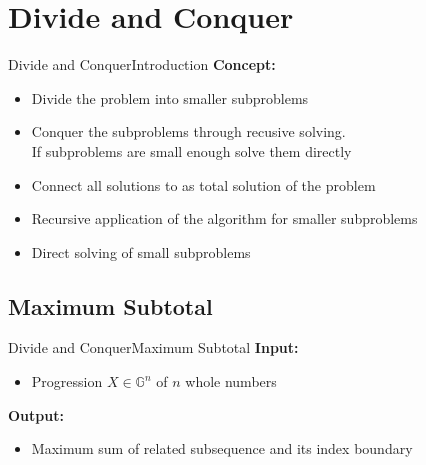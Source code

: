 \section{Divide and Conquer}


\begin{frame}{Divide and Conquer}{Introduction}
  \textbf{Concept:}
  \begin{itemize}
    \item
      {\color{Mittel-Blau}Divide} the problem into smaller subproblems
    \item
      {\color{Mittel-Blau}Conquer} the subproblems through recusive solving.\\
      If subproblems are small enough solve them directly
    \item
      {\color{Mittel-Blau}Connect} all solutions to as total solution of the
      problem
  \end{itemize}
  \vspace{1.0em}
  \begin{itemize}
    \item
      {\color{Mittel-Blau}Recursive} application of the algorithm for smaller
      subproblems
    \item
      {\color{Mittel-Blau}Direct} solving of small subproblems
  \end{itemize}
\end{frame}


\subsection{Maximum Subtotal}

\begin{frame}{Divide and Conquer}{Maximum Subtotal}
  \textbf{Input:}
  \begin{itemize}
    \item
      Progression $X \in \mathbb{G}^n$ of $n$ whole numbers
  \end{itemize}
  \textbf{Output:}
  \begin{itemize}
    \item
      Maximum sum of related subsequence and its index boundary
  \end{itemize}
\end{frame}

